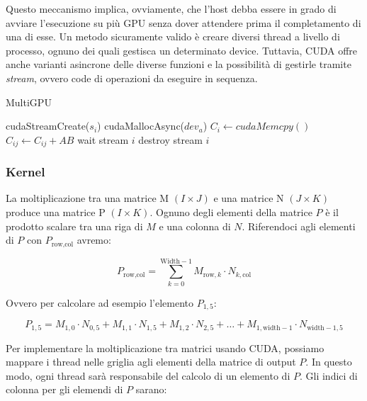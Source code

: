 \documentclass[a4paper]{article}
\begin{document}

Questo meccanismo implica, ovviamente, che l'host debba essere in grado di avviare l'esecuzione su più GPU senza dover attendere prima il completamento di una di esse.
Un metodo sicuramente valido è creare diversi thread a livello di processo, ognuno dei quali gestisca un determinato device.
Tuttavia, CUDA offre anche varianti asincrone delle diverse funzioni e la possibilità di gestirle tramite \textit{stream}, ovvero code di operazioni da eseguire in sequenza.

\begin{algorithm}[h]
    \caption{MultiGPU}
    \begin{algorithmic}
        \State cudaStreamCreate($s_i$)
        \State cudaMallocAsync($dev_a$)
        \State $C_i \gets cudaMemcpy()$
        \State $C_{ij} \gets C_{ij} + AB$
        \EndFor
        \State wait stream $i$
        \State destroy stream $i$
        \EndFor
    \end{algorithmic}
\end{algorithm}

\subsubsection{Kernel}

La moltiplicazione tra una matrice M $(I\times{J})$ e una matrice N $(J\times{K})$ produce una matrice P $(I\times{K})$. Ognuno degli elementi della matrice $P$ è il prodotto scalare tra una riga di $M$ e una colonna di $N$. Riferendoci agli elementi di $P$ con $P_{\text{row}, \text{col}}$ avremo:

\[
    P_{\text{row}, \text{col}} = \sum_{k=0}^{\text{Width}-1} M_{\text{row}, k} \cdot N_{k, \text{col}}
\]

Ovvero per calcolare ad esempio l'elemento $P_{1, 5}$:

\[
    P_{1,5} = M_{1,0} \cdot N_{0,5} + M_{1,1} \cdot N_{1,5} + M_{1,2} \cdot N_{2,5} + \ldots + M_{1,\text{width}-1} \cdot N_{\text{width}-1,5}
\]

Per implementare la moltiplicazione tra matrici usando CUDA, possiamo mappare i thread nelle griglia agli elementi della matrice di output $P$. In questo modo, ogni thread sarà responsabile del calcolo di un elemento di $P$. Gli indici di colonna per gli elemendi di $P$ sarano:
\end{document}
